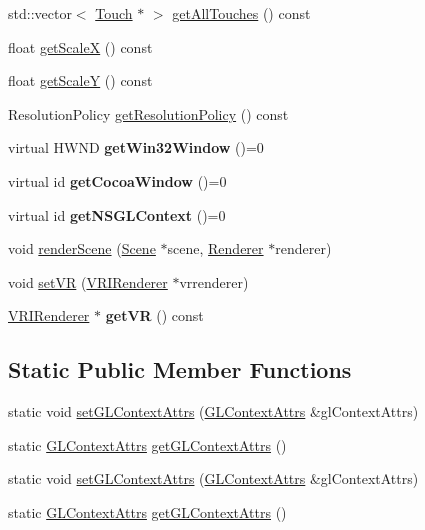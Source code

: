 \begin{DoxyCompactItemize}
std\+::vector$<$ \hyperlink{classTouch}{Touch} $\ast$ $>$ \hyperlink{classGLView_af967a29c1bde166b9f48b1d8d1174d91}{get\+All\+Touches} () const
\item 
float \hyperlink{classGLView_a98f6226c66f3614d21f61ed844ed28bb}{get\+ScaleX} () const
\item 
float \hyperlink{classGLView_a3ee3994af139859a58568ccf3ba85aa6}{get\+ScaleY} () const
\item 
Resolution\+Policy \hyperlink{classGLView_a826c04e9fc58895b6a7d95ba68ac1ba1}{get\+Resolution\+Policy} () const
\item 
\mbox{\label{classGLView_aa143334d2fcc5beebc75f3216d91e3bd}} 
virtual H\+W\+ND {\bfseries get\+Win32\+Window} ()=0
\item 
\mbox{\label{classGLView_a6b457d77ae8c3cf0b400d0921d7a3ee8}} 
virtual id {\bfseries get\+Cocoa\+Window} ()=0
\item 
\mbox{\label{classGLView_a4ac91ffda3c070716567486400a431fc}} 
virtual id {\bfseries get\+N\+S\+G\+L\+Context} ()=0
\item 
void \hyperlink{classGLView_a47d30a4a1d8ed5f7a1556c456a5af74f}{render\+Scene} (\hyperlink{classScene}{Scene} $\ast$scene, \hyperlink{classRenderer}{Renderer} $\ast$renderer)
\item 
void \hyperlink{classGLView_a28b947c83a97c1cbda8a34acadd62f7b}{set\+VR} (\hyperlink{classVRIRenderer}{V\+R\+I\+Renderer} $\ast$vrrenderer)
\item 
\mbox{\label{classGLView_ac9dc79a10d42cd277ec851ebb0ab01f9}} 
\hyperlink{classVRIRenderer}{V\+R\+I\+Renderer} $\ast$ {\bfseries get\+VR} () const
\end{DoxyCompactItemize}
\subsection*{Static Public Member Functions}
\begin{DoxyCompactItemize}
\item 
static void \hyperlink{classGLView_abf100389994d936ad6bf9f32966bb7cf}{set\+G\+L\+Context\+Attrs} (\hyperlink{structGLContextAttrs}{G\+L\+Context\+Attrs} \&gl\+Context\+Attrs)
\item 
static \hyperlink{structGLContextAttrs}{G\+L\+Context\+Attrs} \hyperlink{classGLView_a763e8536b9443103dec35f4f0cc843ff}{get\+G\+L\+Context\+Attrs} ()
\item 
static void \hyperlink{classGLView_a67b7c433b4bb6578948ca06ac01d1e38}{set\+G\+L\+Context\+Attrs} (\hyperlink{structGLContextAttrs}{G\+L\+Context\+Attrs} \&gl\+Context\+Attrs)
\item 
static \hyperlink{structGLContextAttrs}{G\+L\+Context\+Attrs} \hyperlink{classGLView_affa74828fec36fea7e3acc692c3f1218}{get\+G\+L\+Context\+Attrs} ()
\end{DoxyCompactItemize}
